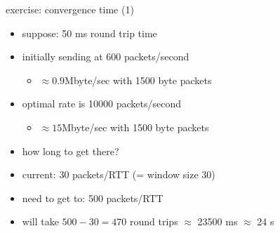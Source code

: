 \begin{frame}{exercise: convergence time (1)}
    \begin{itemize}
    \item suppose: 50 ms round trip time
    \item initially sending at 600 packets/second
        \begin{itemize}
        \item $\approx 0.9$Mbyte/sec with 1500 byte packets
        \end{itemize}
    \item optimal rate is 10000 packets/second
        \begin{itemize}
        \item $\approx 15$Mbyte/sec with 1500 byte packets
        \end{itemize}
    \item how long to get there?
    \vspace{.5cm}
    \item<2-> current: 30 packets/RTT (= window size 30)
    \item<2-> need to get to: 500 packets/RTT
    \item<2-> will take $500-30=470$ round trips $\approx$ 23500 ms $\approx$ 24 s
    \end{itemize}
\end{frame}
